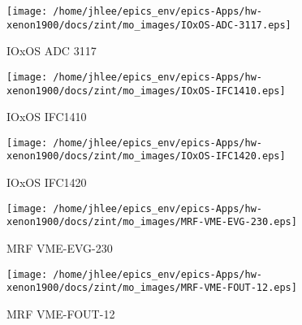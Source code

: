 \noindent
\vspace{1.4cm}
\begin{minipage}{.2\textwidth}
\begin{center}
\texttt{[image: /home/jhlee/epics\_env/epics-Apps/hw-xenon1900/docs/zint/mo\_images/IOxOS-ADC-3117.eps]}
\end{center}
\end{minipage}
\begin{minipage}{.7\textwidth}
IOxOS ADC 3117
\end{minipage}


\noindent
\vspace{1.4cm}
\begin{minipage}{.2\textwidth}
\begin{center}
\texttt{[image: /home/jhlee/epics\_env/epics-Apps/hw-xenon1900/docs/zint/mo\_images/IOxOS-IFC1410.eps]}
\end{center}
\end{minipage}
\begin{minipage}{.7\textwidth}
IOxOS IFC1410
\end{minipage}


\noindent
\vspace{1.4cm}
\begin{minipage}{.2\textwidth}
\begin{center}
\texttt{[image: /home/jhlee/epics\_env/epics-Apps/hw-xenon1900/docs/zint/mo\_images/IOxOS-IFC1420.eps]}
\end{center}
\end{minipage}
\begin{minipage}{.7\textwidth}
IOxOS IFC1420
\end{minipage}


\noindent
\vspace{1.4cm}
\begin{minipage}{.2\textwidth}
\begin{center}
\texttt{[image: /home/jhlee/epics\_env/epics-Apps/hw-xenon1900/docs/zint/mo\_images/MRF-VME-EVG-230.eps]}
\end{center}
\end{minipage}
\begin{minipage}{.7\textwidth}
MRF VME-EVG-230
\end{minipage}


\noindent
\vspace{1.4cm}
\begin{minipage}{.2\textwidth}
\begin{center}
\texttt{[image: /home/jhlee/epics\_env/epics-Apps/hw-xenon1900/docs/zint/mo\_images/MRF-VME-FOUT-12.eps]}
\end{center}
\end{minipage}
\begin{minipage}{.7\textwidth}
MRF VME-FOUT-12
\end{minipage}


